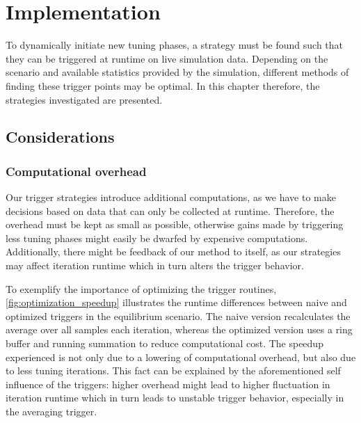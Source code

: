 \chapter[Implementation]{Implementation}
\label{cp:implementation}

{
	\parindent0pt
	To dynamically initiate new tuning phases, a strategy must be found such that they can be triggered at runtime on live simulation data. Depending on the scenario and available statistics provided by the simulation, different methods of finding these trigger points may be optimal. In this chapter therefore, the strategies investigated are presented.
}

\section{Considerations}
\subsection{Computational overhead}
Our trigger strategies introduce additional computations, as we have to make decisions based on data that can only be collected at runtime. Therefore, the overhead must be kept as small as possible, otherwise gains made by triggering less tuning phases might easily be dwarfed by expensive computations. Additionally, there might be feedback of our method to itself, as our strategies may affect iteration runtime which in turn alters the trigger behavior.

To exemplify the importance of optimizing the trigger routines, \autoref{fig:optimization_speedup} illustrates the runtime differences between naive and optimized triggers in the equilibrium scenario. The naive version recalculates the average over all samples each iteration, whereas the optimized version uses a ring buffer and running summation to reduce computational cost. 
The speedup experienced is not only due to a lowering of computational overhead, but also due to less tuning iterations. This fact can be explained by the aforementioned self influence of the triggers: higher overhead might lead to higher fluctuation in iteration runtime which in turn leads to unstable trigger behavior, especially in the averaging trigger.


